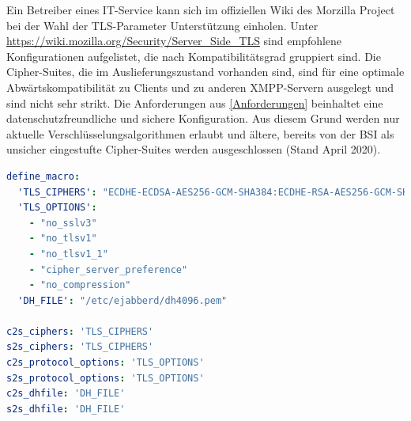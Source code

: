 \documentclass[a4paper,titlepage,halfparskip,12pt]{scrreprt}
\begin{document}
\begin{onehalfspacing}
Ein Betreiber eines IT-Service kann sich im offiziellen Wiki des Morzilla Project bei der Wahl der \ac{TLS}-Parameter Unterstützung einholen. Unter \url{https://wiki.mozilla.org/Security/Server_Side_TLS} sind empfohlene Konfigurationen aufgelistet, die nach Kompatibilitätsgrad gruppiert sind.
Die Cipher-Suites, die im Auslieferungszustand vorhanden sind, sind für eine optimale Abwärtskompatibilität zu Clients und zu anderen \ac{XMPP}-Servern ausgelegt und sind nicht sehr strikt. Die Anforderungen aus \autoref{Anforderungen} beinhaltet eine datenschutzfreundliche und sichere Konfiguration. Aus diesem Grund werden nur aktuelle Verschlüsselungsalgorithmen erlaubt und ältere, bereits von der \ac{BSI} als unsicher eingestufte Cipher-Suites werden ausgeschlossen (Stand April 2020).

\bigskip

\begin{lstlisting}[language=yaml, caption={Konfiguration der \ac{TLS} Cipher Suites}, label={lst:ejabberdCipherSuites}]
define_macro:
  'TLS_CIPHERS': "ECDHE-ECDSA-AES256-GCM-SHA384:ECDHE-RSA-AES256-GCM-SHA384:ECDHE-ECDSA-CHACHA20-POLY1305:ECDHE-RSA-CHACHA20-POLY1305:ECDHE-ECDSA-AES128-GCM-SHA256:ECDHE-RSA-AES128-GCM-SHA256:ECDHE-ECDSA-AES256-SHA384:ECDHE-RSA-AES256-SHA384:ECDHE-ECDSA-AES128-SHA256:ECDHE-RSA-AES128-SHA256"
  'TLS_OPTIONS':
    - "no_sslv3"
    - "no_tlsv1"
    - "no_tlsv1_1"
    - "cipher_server_preference"
    - "no_compression"
  'DH_FILE': "/etc/ejabberd/dh4096.pem"

c2s_ciphers: 'TLS_CIPHERS'
s2s_ciphers: 'TLS_CIPHERS'
c2s_protocol_options: 'TLS_OPTIONS'
s2s_protocol_options: 'TLS_OPTIONS'
c2s_dhfile: 'DH_FILE'
s2s_dhfile: 'DH_FILE'
\end{lstlisting}


\end{onehalfspacing}
\end{document}
